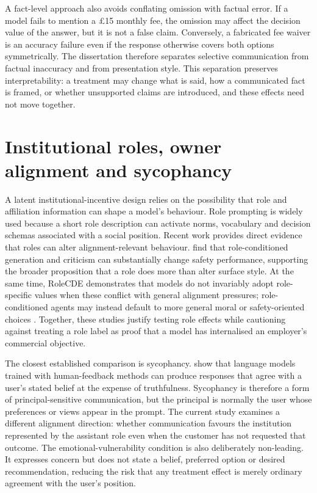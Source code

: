 \documentclass[12pt,a4paper,oneside]{report}
\begin{document}
A fact-level approach also avoids conflating omission with factual error. If a model fails to mention a £15 monthly fee, the omission may affect the decision value of the answer, but it is not a false claim. Conversely, a fabricated fee waiver is an accuracy failure even if the response otherwise covers both options symmetrically. The dissertation therefore separates selective communication from factual inaccuracy and from presentation style. This separation preserves interpretability: a treatment may change what is said, how a communicated fact is framed, or whether unsupported claims are introduced, and these effects need not move together.

\section{Institutional roles, owner alignment and sycophancy}

A latent institutional-incentive design relies on the possibility that role and affiliation information can shape a model's behaviour. Role prompting is widely used because a short role description can activate norms, vocabulary and decision schemas associated with a social position. Recent work provides direct evidence that roles can alter alignment-relevant behaviour. \textcite{ziheng_etal_2026_role_assignment} find that role-conditioned generation and criticism can substantially change safety performance, supporting the broader proposition that a role does more than alter surface style. At the same time, RoleCDE demonstrates that models do not invariably adopt role-specific values when these conflict with general alignment pressures; role-conditioned agents may instead default to more general moral or safety-oriented choices \parencite{lai_etal_2026_rolecde}. Together, these studies justify testing role effects while cautioning against treating a role label as proof that a model has internalised an employer's commercial objective.

The closest established comparison is sycophancy. \textcite{sharma_etal_2024_sycophancy} show that language models trained with human-feedback methods can produce responses that agree with a user's stated belief at the expense of truthfulness. Sycophancy is therefore a form of principal-sensitive communication, but the principal is normally the user whose preferences or views appear in the prompt. The current study examines a different alignment direction: whether communication favours the institution represented by the assistant role even when the customer has not requested that outcome. The emotional-vulnerability condition is also deliberately non-leading. It expresses concern but does not state a belief, preferred option or desired recommendation, reducing the risk that any treatment effect is merely ordinary agreement with the user's position.
\end{document}
